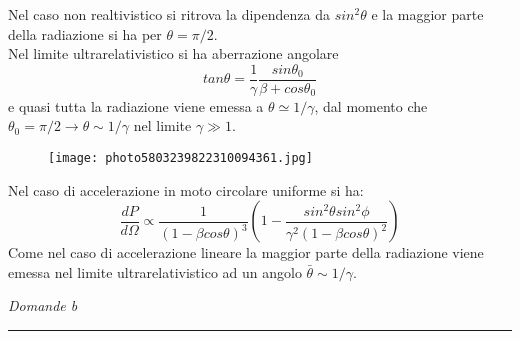 \documentclass[twoside]{article}
\begin{document}
Nel caso non realtivistico si ritrova la dipendenza da $sin^2\theta$ e la maggior parte della radiazione si ha per $\theta=\pi/2$. \\
Nel limite ultrarelativistico si ha aberrazione angolare
\begin{equation}
    tan\theta=\frac{1}{\gamma}\frac{sin\theta_0}{\beta+cos\theta_0}
\end{equation}
e quasi tutta la radiazione viene emessa a $\theta \simeq 1/\gamma$, dal momento che $\theta_0=\pi/2 \to \theta\sim 1/\gamma$ nel limite $\gamma \gg 1$.
\\
\begin{figure}[H]
    \centering
    \texttt{[image: photo5803239822310094361.jpg]}
\end{figure}

Nel caso di accelerazione in moto circolare uniforme si ha:
\begin{equation}
 \frac{dP}{d\Omega} \propto \frac{1}{(1-\beta cos \theta)^3}\left(1-\frac{sin^2\theta sin^2\phi}{\gamma^2 (1-\beta cos\theta)^2}\right)
\end{equation}
Come nel caso di accelerazione lineare la maggior parte della radiazione viene emessa nel limite ultrarelativistico ad un angolo $\bar{\theta}\sim 1/\gamma$.

\textit{Domande b}\rule{13.7cm}{0.4pt}
    
\end{document}
